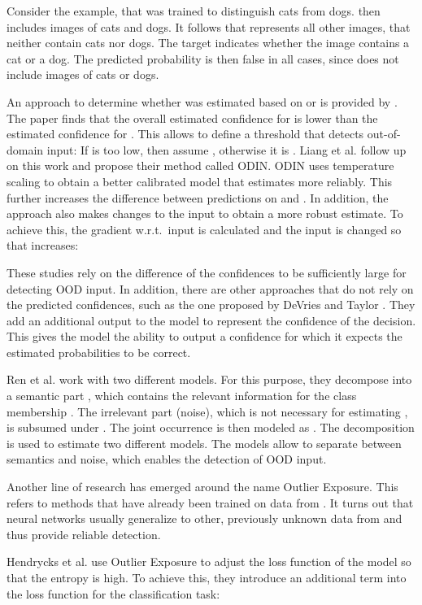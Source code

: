 \documentclass{article}
\begin{document}
Consider the example, that  was trained to distinguish cats from dogs.  then includes images of cats and dogs. It follows that  represents all other images, that neither contain cats nor dogs. The target  indicates whether the image contains a cat or a dog. The predicted probability  is then false in all cases, since  does not include images of cats or dogs.

An approach to determine whether  was estimated based on  or  is provided by \cite{Hendrycks.2016}. The paper finds that the overall estimated confidence for  is lower than the estimated confidence for . This allows to define a threshold that detects out-of-domain input: If  is too low, then assume , otherwise it is . Liang et al. \cite{Liang.2017} follow up on this work and propose their method called ODIN. ODIN uses temperature scaling to obtain a better calibrated model that estimates  more reliably. This further increases the difference between predictions on  and . In addition, the approach also makes changes to the input to obtain a more robust estimate. To achieve this, the gradient w.r.t.~input is calculated and the input is changed so that  increases:


These studies rely on the difference of the confidences to be sufficiently large for detecting OOD input. In addition, there are other approaches that do not rely on the predicted confidences, such as the one proposed by  DeVries and Taylor \cite{DeVries.2018}. They add an additional output to the model to represent the confidence of the decision. This gives the model the ability to output a confidence for which it expects the estimated probabilities to be correct.

Ren et al. \cite{Ren.07.06.2019} work with two different models. For this purpose, they decompose  into a semantic part , which contains the relevant information for the class membership . The irrelevant part (noise), which is not necessary for estimating , is subsumed under . The joint occurrence is then modeled as . The decomposition is used to estimate two different models. The models allow to separate between semantics and noise, which enables the detection of OOD input.

Another line of research has emerged around the name Outlier Exposure. This refers to methods that have already been trained on data from . It turns out that neural networks usually generalize to other, previously unknown data from  and thus provide reliable detection.

Hendrycks et al. \cite{Hendrycks.2018} use Outlier Exposure to adjust the loss function  of the model so that the entropy  is high. To achieve this, they introduce an additional term into the loss function for the classification task:
\end{document}
